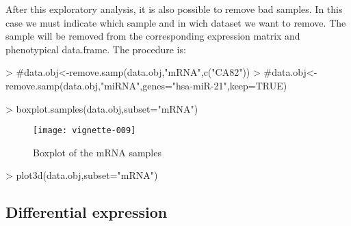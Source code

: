 \documentclass{article}
\begin{document}
After this exploratory analysis, it is also possible to remove bad samples. In this case we must indicate which sample and in wich dataset we want to remove. The sample will be removed from the corresponding expression matrix and phenotypical data.frame. The procedure is:
\begin{Schunk}
\begin{Sinput}
> #data.obj<-remove.samp(data.obj,"mRNA",c("CA82"))
> #data.obj<-remove.samp(data.obj,"miRNA",genes="hsa-miR-21",keep=TRUE)
\end{Sinput}
\end{Schunk}


\begin{Schunk}
\begin{Sinput}
> boxplot.samples(data.obj,subset="mRNA")
\end{Sinput}
\end{Schunk}

\begin{figure}[!h]
\centering
\texttt{[image: vignette-009]}
\caption[]{Boxplot of the mRNA samples}
\label{fig:boxplot}
\end{figure}




\begin{Schunk}
\begin{Sinput}
> plot3d(data.obj,subset="mRNA")
\end{Sinput}
\end{Schunk}



\subsection{Differential expression}
\end{document}
